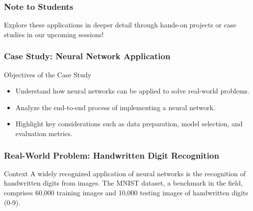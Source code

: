\documentclass[aspectratio=169]{beamer}
\begin{document}
\begin{frame}[fragile]
    \frametitle{Note to Students}
    Explore these applications in deeper detail through hands-on projects or case studies in our upcoming sessions!
\end{frame}

\begin{frame}
    \frametitle{Case Study: Neural Network Application}
    \begin{block}{Objectives of the Case Study}
        \begin{itemize}
            \item Understand how neural networks can be applied to solve real-world problems.
            \item Analyze the end-to-end process of implementing a neural network.
            \item Highlight key considerations such as data preparation, model selection, and evaluation metrics.
        \end{itemize}
    \end{block}
\end{frame}

\begin{frame}
    \frametitle{Real-World Problem: Handwritten Digit Recognition}
    \begin{block}{Context}
        A widely recognized application of neural networks is the recognition of handwritten digits from images. The MNIST dataset, a benchmark in the field, comprises 60,000 training images and 10,000 testing images of handwritten digits (0-9).
    \end{block}
\end{frame}
\end{document}
